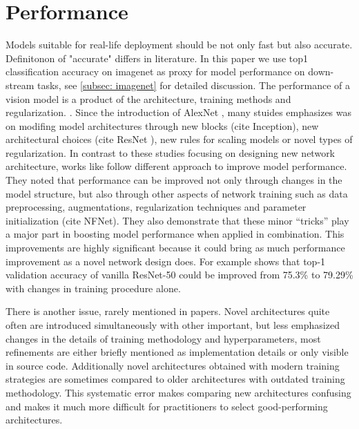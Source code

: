 
\chapter{Performance} \label{sec: performance}

Models suitable for real-life deployment should be not only fast but also accurate. Definitonon of "accurate" differs in literature. In this paper we use top1 classification accuracy on imagenet as proxy for model performance on down-stream tasks, see \ref{subsec: imagenet} for detailed discussion. 
The performance of a vision model is a product of the architecture, training methods and regularization. \cite{lee2020_compounding_improvements}. 
Since the introduction of AlexNet \cite{krizhevsky2012_imagenet_alexnet}, many stuides emphasizes was on modifing model architectures through new blocks (cite Inception), new architectural choices (cite ResNet ), new rules for scaling models \cite{tan2019_efficientnet} or novel types of regularization. \cite{zhang2017_mixup} \cite{yun2019_cutmix}
In contrast to these studies focusing on designing new network architecture, works like \cite{he2019bag_of_tricks} follow different approach to improve model performance. They noted that performance can be improved not only through changes in the model structure, but also through other aspects of network training such as data preprocessing, augmentations, regularization techniques and parameter initialization (cite NFNet). They also demonstrate that these minor “tricks” play a major part in boosting model performance when applied in combination. This improvements are highly significant because it could bring as much performance improvement as a novel network design does. For example \cite{he2019bag_of_tricks} shows that top-1 validation accuracy of vanilla ResNet-50 could be improved from 75.3\% to 79.29\% with changes in training procedure alone. 


There is another issue, rarely mentioned in papers. Novel architectures quite often are introduced simultaneously with other important, but less emphasized changes in the details of training methodology and hyperparameters, most refinements are either briefly mentioned as implementation details or only visible in source code. Additionally novel architectures obtained with modern training strategies are sometimes compared to older architectures with outdated training methodology. This systematic error makes comparing new architectures confusing and makes it much more difficult for practitioners to select good-performing architectures. 

